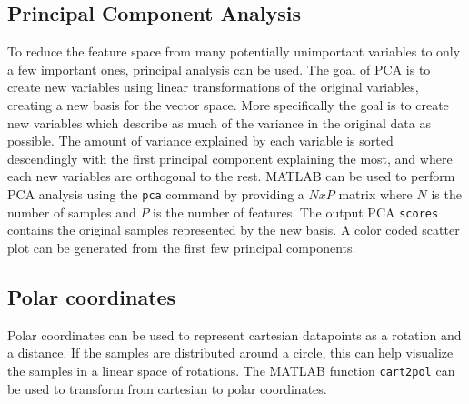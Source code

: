 \subsection{Principal Component Analysis}
To reduce the feature space from many potentially unimportant variables to only a few important ones, principal analysis can be used.
The goal of PCA is to create new variables using linear transformations of the original variables, creating a new basis for the vector space. More specifically the goal is to create new variables which describe as much of the variance in the original data as possible.
The amount of variance explained by each variable is sorted descendingly with the first principal component explaining the most, and where each new variables are orthogonal to the rest. MATLAB can be used to perform PCA analysis using the \texttt{pca} command by providing a $NxP$ matrix where $N$ is the number of samples and $P$ is the number of features. The output PCA \texttt{scores} contains the original samples represented by the new basis.  
A color coded scatter plot can be generated from the first few principal components. 

\subsection{Polar coordinates}
Polar coordinates can be used to represent cartesian datapoints as a rotation and a distance. If the samples are  distributed around a circle, this can help visualize the samples in a linear space of rotations. The MATLAB function \texttt{cart2pol} can be used to transform from cartesian to polar coordinates.



